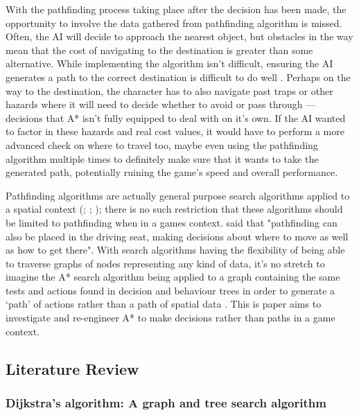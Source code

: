 \documentclass[11pt, a4paper]{article}
\begin{document}
With the pathfinding process taking place after the decision has been made, the opportunity to involve the data gathered from pathfinding algorithm is missed. Often, the AI will decide to approach the nearest object, but obstacles in the way mean that the cost of navigating to the destination is greater than some alternative. While implementing the algorithm isn't difficult, ensuring the AI generates a path to the correct destination is difficult to do well \parencite{forbus2002qualitative}. Perhaps on the way to the destination, the character has to also navigate past traps or other hazards where it will need to decide whether to avoid or pass through --- decisions that A* isn't fully equipped to deal with on it's own. If the AI wanted to factor in these hazards and real cost values, it would have to perform a more advanced check on where to travel too, maybe even using the pathfinding algorithm multiple times to definitely make sure that it wants to take the generated path, potentially ruining the game's speed and overall performance.

Pathfinding algorithms are actually general purpose search algorithms applied to a spatial context (\cite[125]{cui2011based}; \cite[6]{orkin2003applying}; \cite[46]{yap2002grid}); there is no such restriction that these algorithms should be limited to pathfinding when in a games context. \citeauthor{millington2019ai} \parencite*[197]{millington2019ai} said that "pathfinding can also be placed in the driving seat, making decisions about where to move as well as how to get there". With search algorithms having the flexibility of being able to traverse graphs of nodes representing any kind of data, it's no stretch to imagine the A* search algorithm being applied to a graph containing the same tests and actions found in decision and behaviour trees in order to generate a `path' of actions rather than a path of spatial data \parencite[114]{higgins2002generic}. This is paper aims to investigate and re-engineer A* to make decisions rather than paths in a game context.

\subsection{Literature Review}
\label{subsec:literatureReview}

\subsubsection{Dijkstra's algorithm: A graph and tree search algorithm}
\label{subsubsec:dijkstrasAlgorithm}
\end{document}
